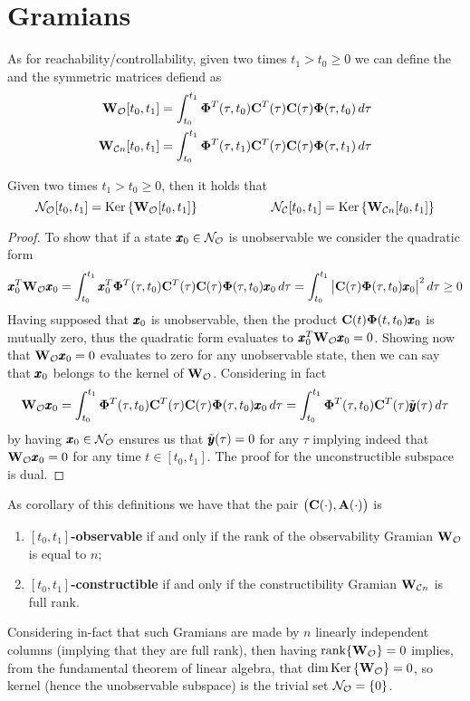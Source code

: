 \section{Gramians}
	As for reachability/controllability, given two times $t_1 > t_0 \geq 0$ we can define the  and  the symmetric matrices defiend as
	\begin{equation}
	\begin{split}
		\mathbf{W}_{\mathcal O}[t_0,t_1] & = \int_{t_0}^{t_1} \mathbf{\Phi}^T(\tau,t_0) \mathbf{C}^T(\tau)\mathbf{C}(\tau) \mathbf{\Phi}(\tau, t_0)\, d\tau \\
		\mathbf{W}_{\mathcal C n}[t_0,t_1] & = \int_{t_0}^{t_1} \mathbf{\Phi}^T(\tau,t_1) \mathbf{C}^T(\tau)\mathbf{C}(\tau) \mathbf{\Phi}(\tau, t_1)\, d\tau 
	\end{split}
	\end{equation}
	\begin{theorem}
		Given two times $t_1 > t_0 \geq 0$, then it holds that
		\begin{equation} \label{eq:obs:temp3}
			\mathcal{N_O}[t_0,t_1] = \textrm{Ker}\left\{\mathbf{W}_{\mathcal O}[t_0,t_1]\right\} \hspace{2cm} \mathcal{N_C}[t_0,t_1] = \textrm{Ker}\left\{\mathbf{W}_{\mathcal C n}[t_0,t_1]\right\}
		\end{equation}
	\end{theorem}
	\begin{proof}
		To show that if a state $\pmb{x}_0\in \mathcal{N_O}$ is unobservable we consider the quadratic form
		\[ \pmb{x}_0^T\mathbf{W}_{\mathcal O} \pmb{x}_0 = \int_{t_0}^{t_1} \pmb{x}_0^T \mathbf{\Phi}^T(\tau,t_0) \mathbf{C}^T(\tau)\mathbf{C}(\tau) \mathbf{\Phi}(\tau, t_0) \pmb{x}_0\, d\tau = \int_{t_0}^{t_1} \big|\mathbf{C}(\tau) \mathbf{\Phi}(\tau,t_0)\pmb{x}_0\big|^2\, d\tau \geq 0 \]
		Having supposed that $\pmb{x}_0$ is unobservable, then the product $\mathbf{C}(t)\mathbf{\Phi}(t,t_0)\pmb{x}_0$ is mutually zero, thus the quadratic form evaluates to $\pmb{x}_0^T\mathbf{W}_{\mathcal O} \pmb{x}_0 = 0$. Showing now that $\mathbf{W}_{\mathcal O} \pmb{x}_0 = 0$ evaluates to zero for any unobservable state, then we can say that $\pmb{x}_0$ belongs to the kernel of $\mathbf{W}_{\mathcal O}$. Considering in fact
		\[ \mathbf{W}_{\mathcal O} \pmb{x}_0 = \int_{t_0}^{t_1} \mathbf{\Phi}^T(\tau,t_0) \mathbf{C}^T(\tau)\mathbf{C}(\tau) \mathbf{\Phi}(\tau, t_0) \pmb{x}_0\, d\tau = \int_{t_0}^{t_1} \mathbf{\Phi}^T(\tau,t_0) \mathbf{C}^T(\tau) \tilde {\pmb{y}}(\tau) \, d\tau  \]
		by having $\pmb{x}_0\in \mathcal{N_O}$ ensures us that $\tilde {\pmb{y}}(\tau) = 0$ for any $\tau$ implying indeed that $\mathbf{W}_{\mathcal O} \pmb{x}_0 =0 $ for any time $t\in [t_0,t_1]$. The proof for the unconstructible subspace is dual.
	\end{proof}
	
	As corollary of this definitions we have that the pair $\big(\mathbf{C}(\cdot), \mathbf{A}(\cdot)\big)$ is
	\begin{enumerate}[\itshape i)]
		\item \textbf{$[t_0,t_1]$-observable} if and only if the rank of the observability Gramian $\mathbf{W}_{\mathcal O}$ is equal to $n$;
		\item \textbf{$[t_0,t_1]$-constructible} if and only if the constructibility Gramian $\mathbf{W}_{\mathcal C n}$ is full rank.
	\end{enumerate}
	Considering in-fact that such Gramians are made by $n$ linearly independent columns (implying that they are full rank), then having $\textrm{rank}\{\mathbf{W}_{\mathcal O}\} = 0$ implies, from the fundamental theorem of linear algebra, that $\dim{\textrm{Ker}\left\{\mathbf{W}_{\mathcal O}\right\}} = 0$, so kernel (hence the unobservable subspace) is the trivial set $\mathcal{N_O} = \{0\}$.	
	
